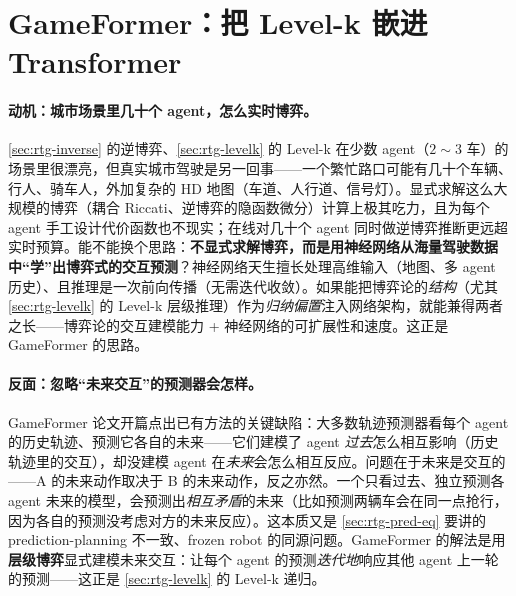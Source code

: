 \section{GameFormer：把 Level-k 嵌进 Transformer}
\label{sec:rtg-gameformer}

\paragraph{动机：城市场景里几十个 agent，怎么实时博弈。}
\cref{sec:rtg-inverse} 的逆博弈、\cref{sec:rtg-levelk} 的 Level-k 在少数 agent（$2\sim3$ 车）的场景里很漂亮，但真实城市驾驶是另一回事——一个繁忙路口可能有几十个车辆、行人、骑车人，外加复杂的 HD 地图（车道、人行道、信号灯）。显式求解这么大规模的博弈（耦合 Riccati、逆博弈的隐函数微分）计算上极其吃力，且为每个 agent 手工设计代价函数也不现实；在线对几十个 agent 同时做逆博弈推断更远超实时预算。能不能换个思路：\textbf{不显式求解博弈，而是用神经网络从海量驾驶数据中“学”出博弈式的交互预测}？神经网络天生擅长处理高维输入（地图、多 agent 历史）、且推理是一次前向传播（无需迭代收敛）。如果能把博弈论的\emph{结构}（尤其 \cref{sec:rtg-levelk} 的 Level-k 层级推理）作为\emph{归纳偏置}注入网络架构，就能兼得两者之长——博弈论的交互建模能力 + 神经网络的可扩展性和速度。这正是 GameFormer 的思路。

\paragraph{反面：忽略“未来交互”的预测器会怎样。}
GameFormer 论文开篇点出已有方法的关键缺陷\cite{huang2023gameformer}：大多数轨迹预测器看每个 agent 的历史轨迹、预测它各自的未来——它们建模了 agent \emph{过去}怎么相互影响（历史轨迹里的交互），却没建模 agent 在\emph{未来}会怎么相互反应。问题在于未来是交互的——A 的未来动作取决于 B 的未来动作，反之亦然。一个只看过去、独立预测各 agent 未来的模型，会预测出\emph{相互矛盾}的未来（比如预测两辆车会在同一点抢行，因为各自的预测没考虑对方的未来反应）。这本质又是 \cref{sec:rtg-pred-eq} 要讲的 prediction-planning 不一致、frozen robot 的同源问题。GameFormer 的解法是用\textbf{层级博弈}显式建模未来交互：让每个 agent 的预测\emph{迭代地}响应其他 agent 上一轮的预测——这正是 \cref{sec:rtg-levelk} 的 Level-k 递归。

